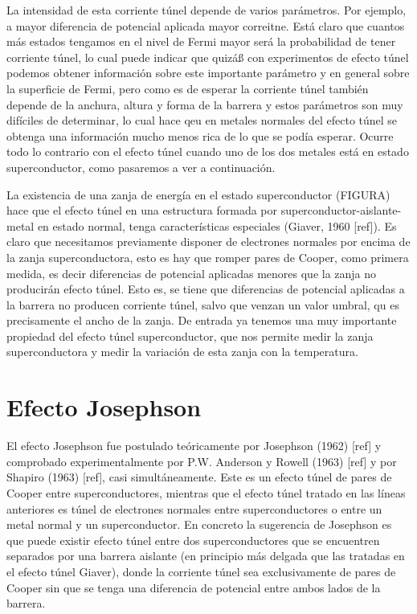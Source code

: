 La intensidad de esta corriente túnel depende de varios parámetros. Por ejemplo, a mayor diferencia de potencial aplicada mayor correitne. Está claro que cuantos más estados tengamos en el nivel de Fermi mayor será la probabilidad de tener corriente túnel, lo cual puede indicar que quizáß con experimentos de efecto túnel podemos obtener información sobre este importante parámetro y en general sobre la superficie de Fermi, pero como es de esperar la corriente túnel también depende de la anchura, altura y forma de la barrera y estos parámetros son muy difíciles de determinar, lo cual hace qeu en metales normales del efecto túnel se obtenga una información mucho menos rica de lo que se podía esperar. Ocurre todo lo contrario con el efecto túnel cuando uno de los dos metales está en estado superconductor, como pasaremos a ver a continuación.

La existencia de una zanja de energía en el estado superconductor (FIGURA) hace que el efecto túnel en una estructura formada por superconductor-aislante-metal en estado normal, tenga características especiales (Giaver, 1960 [ref]). Es claro que necesitamos previamente disponer de electrones normales por encima de la zanja superconductora, esto es hay que romper pares de Cooper, como primera medida, es decir diferencias de potencial aplicadas menores que la zanja no producirán efecto túnel. Esto es, se tiene que diferencias de potencial aplicadas a la barrera no producen corriente túnel, salvo que venzan un valor umbral, qu es precisamente el ancho de la zanja. De entrada ya tenemos una muy importante propiedad del efecto túnel superconductor, que nos permite medir la zanja superconductora y medir la variación de esta zanja con la temperatura.

\section{Efecto Josephson}

El efecto Josephson fue postulado teóricamente por Josephson (1962) [ref] y comprobado experimentalmente por P.W. Anderson y Rowell (1963) [ref] y por Shapiro (1963) [ref], casi simultáneamente. Este es un efecto túnel de pares de Cooper entre superconductores, mientras que el efecto túnel tratado en las líneas anteriores es túnel de electrones normales entre superconductores o entre un metal normal y un superconductor. En concreto la sugerencia de Josephson es que puede existir efecto túnel entre dos superconductores que se encuentren separados por una barrera aislante (en principio más delgada que las tratadas en el efecto túnel Giaver), donde la corriente túnel sea exclusivamente de pares de Cooper sin que se tenga una diferencia de potencial entre ambos lados de la barrera.

